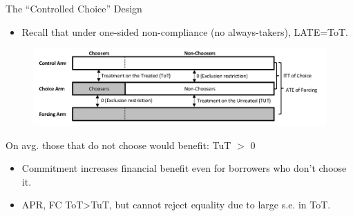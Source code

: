 \documentclass[8pt]{beamer}
\begin{document}
\begin{frame}{The ``Controlled Choice'' Design}
\label{cc_design}
\begin{itemize}
    \item Recall that under one-sided non-compliance (no always-takers), LATE=ToT.
\end{itemize}
\vspace{.2in}
\begin{figure}[H]
    \begin{center}
        \centering
        \includegraphics[width=1.0\textwidth]{Figuras/tot_tut_intuition.png}
    \end{center}
\end{figure}   
 \vfill
\end{frame}




\begin{frame}{On avg. those that do not choose would benefit: TuT $>$ 0}
\begin{itemize}
    \vfill \item Commitment increases financial benefit even for borrowers who don't choose  it.
    \vfill \item APR, FC ToT>TuT, but cannot reject equality due to large s.e. in ToT.
\end{itemize}
\vspace{.2in}
\begin{table}[H]
\label{tot_tut}
\begin{center}
\small{}
\end{center}
\end{table}
\end{frame}

\end{document}
